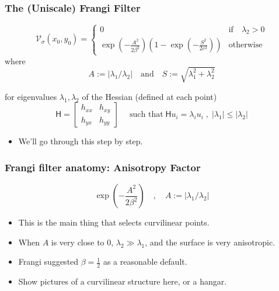 \documentclass[9pt,notes]{beamer}
\newcommand{\Vsigma}{\ensuremath{\mathcal{V}_{\sigma}}\xspace}
\begin{document}
\begin{frame}
\frametitle{The (Uniscale) Frangi Filter}
  \begin{equation}
  \Vsigma(x_0,y_0) =
  \begin{cases}
  0 & \text{if} \quad \lambda_2 > 0 \\
  \exp\left(-\frac{A^2}{2\beta^2}\right)
  \left(1 - \exp\left(-\frac{S^2}{2c^2}\right)\right) & \textrm{otherwise}
  \end{cases}
  \end{equation}
where
  \begin{equation}
  A := \left|\lambda_1 / \lambda_2\right|
  \quad \textrm{and} \quad 
  S := \sqrt{\lambda_1^2 + \lambda_2^2}
  \end{equation}

for eigenvalues $\lambda_1, \lambda_2$ of the Hessian (defined at each point)
  \begin{equation}
    \mathsf{H} = \begin{bmatrix} h_{xx} & h_{xy} \\
                                 h_{yx} & h_{yy}
                 \end{bmatrix}
    \quad \;\textrm{such that}\;
    \mathsf{H} u_i = \lambda_i u_i \;,\;
    \left|\lambda_1\right| \leq \left|\lambda_2\right|
  \end{equation}
  
  \begin{itemize}
    \item We'll go through this step by step.
  \end{itemize}
\end{frame}

\begin{frame}
\frametitle[Anisotropy Factor]{Frangi filter anatomy: Anisotropy Factor}
\begin{equation}
\exp\left(-\frac{A^2}{2\beta^2}\right) \quad,\quad
A := \left|\lambda_1 / \lambda_2\right|
\end{equation}
\begin{itemize}
  \item This is the main thing that selects curvilinear points.
  \item When $A$ is very close to 0, $\lambda_2 \gg \lambda_1$, and the surface is very anisotropic.
  \item Frangi suggested $\beta=\frac{1}{2}$ as a reasonable default.
  \item Show pictures of a curvilinear structure here, or a hangar.
\end{itemize}
\end{frame}
\end{document}
